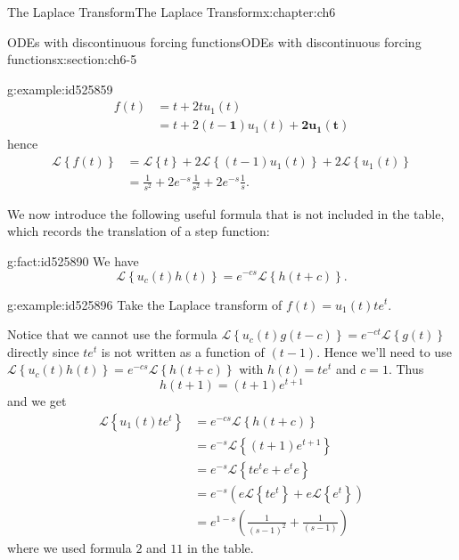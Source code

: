 \documentclass[oneside,10pt,]{book}
\numberwithin{equation}{section}
\numberwithin{equation}{section}
\newcommand{\amp}{&}
\begin{document}
\begin{chapterptx}{The Laplace Transform}{}{The Laplace Transform}{}{}{x:chapter:ch6}
\begin{sectionptx}{ODEs with discontinuous forcing functions}{}{ODEs with discontinuous forcing functions}{}{}{x:section:ch6-5}
\begin{example}{}{g:example:id525859}
\begin{align*}
f(t) \amp =t+2tu_{1}(t)\\
\amp =t+2\left(t-\boldsymbol{1}\right)u_{1}(t)+\boldsymbol{2u_{1}(t)}
\end{align*}
hence%
\begin{align*}
\mathcal{L}\left\{ f(t)\right\}  \amp =\mathcal{L}\left\{ t\right\} +2\mathcal{L}\left\{ (t-1)u_{1}(t)\right\} +2\mathcal{L}\left\{ u_{1}(t)\right\} \\
\amp =\frac{1}{s^{2}}+2e^{-s}\frac{1}{s^{2}}+2e^{-s}\frac{1}{s}.
\end{align*}
%
\end{example}
We now introduce the following useful formula that is not included in the table, which records the translation of a step function:%
\begin{fact}{}{}{g:fact:id525890}%
We have%
\begin{equation*}
\mathcal{L}\left\{ u_{c}(t)h(t)\right\} =e^{-cs}\mathcal{L}\left\{ h\left(t+c\right)\right\} .
\end{equation*}
%
\end{fact}
\begin{example}{}{g:example:id525896}%
Take the Laplace transform of \(f(t)=u_{1}(t)te^{t}\).%
\par
Notice that we cannot use the formula \(\mathcal{L}\left\{ u_{c}(t)g\left(t-c\right)\right\} =e^{-ct}\mathcal{L}\left\{ g(t)\right\} \) directly since \(te^{t}\) is not written as a function of \((t-1)\). Hence we'll need to use \(\mathcal{L}\left\{ u_{c}(t)h(t)\right\} =e^{-cs}\mathcal{L}\left\{ h\left(t+c\right)\right\} \) with \(h(t)=te^{t}\) and \(c=1\). Thus%
\begin{equation*}
h\left(t+1\right)=(t+1)e^{t+1}
\end{equation*}
and we get%
\begin{align*}
\mathcal{L}\left\{ u_{1}(t)te^{t}\right\}  \amp =e^{-cs}\mathcal{L}\left\{ h\left(t+c\right)\right\} \\
\amp =e^{-s}\mathcal{L}\left\{ (t+1)e^{t+1}\right\} \\
\amp =e^{-s}\mathcal{L}\left\{ te^{t}e+e^{t}e\right\} \\
\amp =e^{-s}\left(e\mathcal{L}\left\{ te^{t}\right\} +e\mathcal{L}\left\{ e^{t}\right\} \right)\\
\amp =e^{1-s}\left(\frac{1}{\left(s-1\right)^{2}}+\frac{1}{\left(s-1\right)}\right)
\end{align*}
where we used formula \(2\) and \(11\) in the table.%
\end{example}

\end{sectionptx}
\end{chapterptx}
\end{document}
